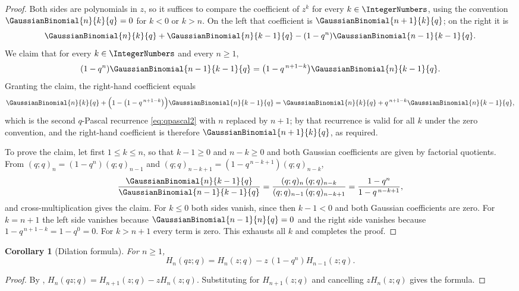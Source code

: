 \documentclass[11pt,a4paper,oneside,openany]{book}
\newtheorem{corollary}[corollary]{Corollary}
\theoremstyle{definition}
\theoremstyle{remark}
\begin{document}
\begin{proof}
Both sides are polynomials in $z$, so it suffices to compare the coefficient
of $z^k$ for every $k\in\IntegerNumbers$, using the convention $\GaussianBinomial{n}{k}{q}=0$ for $k<0$ or
$k>n$.  On the left that coefficient is $\GaussianBinomial{n+1}{k}{q}$; on the right it is
\[
 \GaussianBinomial{n}{k}{q}+\GaussianBinomial{n}{k-1}{q}-(1-q^n)\GaussianBinomial{n-1}{k-1}{q}.
\]
We claim that for every $k\in\IntegerNumbers$ and every $n\ge1$,
\[
 (1-q^n)\GaussianBinomial{n-1}{k-1}{q}=\bigl(1-q^{\,n+1-k}\bigr)\GaussianBinomial{n}{k-1}{q}.
\]
Granting the claim, the right-hand coefficient equals
\[
 \GaussianBinomial{n}{k}{q}+\Bigl(1-\bigl(1-q^{\,n+1-k}\bigr)\Bigr)\GaussianBinomial{n}{k-1}{q}
 =\GaussianBinomial{n}{k}{q}+q^{\,n+1-k}\GaussianBinomial{n}{k-1}{q},
\]
which is the second $q$-Pascal recurrence \eqref{eq:qpascal2} with $n$
replaced by $n+1$; by  that recurrence is valid for all $k$
under the zero convention, and the right-hand coefficient is therefore
$\GaussianBinomial{n+1}{k}{q}$, as required.

To prove the claim, let first $1\le k\le n$, so that $k-1\ge0$ and
$n-k\ge0$ and both Gaussian coefficients are given by factorial quotients.
From $(q;q)_n=(1-q^n)(q;q)_{n-1}$ and
$(q;q)_{n-k+1}=(1-q^{\,n-k+1})(q;q)_{n-k}$,
\[
 \frac{\GaussianBinomial{n}{k-1}{q}}{\GaussianBinomial{n-1}{k-1}{q}}
 =\frac{(q;q)_n\,(q;q)_{n-k}}{(q;q)_{n-1}\,(q;q)_{n-k+1}}
 =\frac{1-q^n}{1-q^{\,n-k+1}},
\]
and cross-multiplication gives the claim.  For $k\le0$ both sides vanish,
since then $k-1<0$ and both Gaussian coefficients are zero.  For $k=n+1$ the
left side vanishes because $\GaussianBinomial{n-1}{n}{q}=0$ and the right side vanishes
because $1-q^{\,n+1-k}=1-q^0=0$.  For $k>n+1$ every term is zero.  This
exhausts all $k$ and completes the proof.
\end{proof}

\begin{corollary}[Dilation formula]\label{cor:rogers-szego-dilation}
For $n\ge1$,
\[
 H_n(qz;q)=H_n(z;q)-z\,(1-q^n)H_{n-1}(z;q).
\]
\end{corollary}

\begin{proof}
By , $H_n(qz;q)=H_{n+1}(z;q)-zH_n(z;q)$.
Substituting  for $H_{n+1}(z;q)$ and
cancelling $zH_n(z;q)$ gives the formula.
\end{proof}
\end{document}
